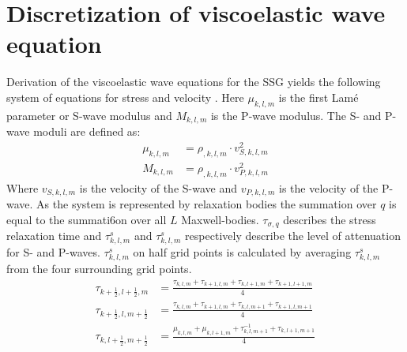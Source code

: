 \documentclass[pdftex,a4paper,parskip,listof=totoc,bibliography=totoc,onehalfspacing,12pt]{scrreprt}
\begin{document}
\section{Discretization of viscoelastic wave equation}
Derivation of the viscoelastic wave equations for the SSG yields the following system of equations for stress and velocity \citep{bohlen2002parallel}. Here $\mu_{k,l,m}$ is the first Lam\'{e} parameter or S-wave modulus and $M_{k,l,m}$ is the P-wave modulus.
The S- and P-wave moduli are defined as:
\begin{align}
	\mu_{k,l,m}&= \rho_{,k,l,m}\cdot v_{S,k,l,m}^{2}\\
	M_{k,l,m} &= \rho_{,k,l,m}\cdot v_{P,k,l,m}^{2}
\end{align}
 Where $v_{S,k,l,m}$ is the velocity of the S-wave and $v_{P,k,l,m}$ is the velocity of the P-wave.
As the system is represented by relaxation bodies the summation over $q$ is equal to the summati6on over all $L$ Maxwell-bodies. $\tau_{\sigma,q}$ describes the stress relaxation time and $\tau_{k,l,m}^s$ and $\tau_{k,l,m}^s$ respectively describe the level of attenuation for S- and P-waves. $\tau_{k,l,m}^s$ on half grid points is calculated by averaging $\tau_{k,l,m}^s$  from the four surrounding grid points. 
\begin{align*}
	\tau_{k+\frac{1}{2},l+\frac{1}{2},m} &= \frac{\tau_{k,l,m} + \tau_{k+1,l,m} + \tau_{k,l+1,m} + \tau_{k+1,l+1,m}}{4}\\
	\tau_{k+\frac{1}{2},l,m+\frac{1}{2}} &= \frac{\tau_{k,l,m} + \tau_{k+1,l,m} + \tau_{k,l,m+1} + \tau_{k+1,l,m+1}}{4}\\
	\tau_{k,l+\frac{1}{2},m+\frac{1}{2}} &= \frac{\mu_{k,l,m} + \mu_{k,l+1,m} + \tau^{-1}_{k,l,m+1} + \tau_{k,l+1,m+1}}{4}
\end{align*}
\end{document}

